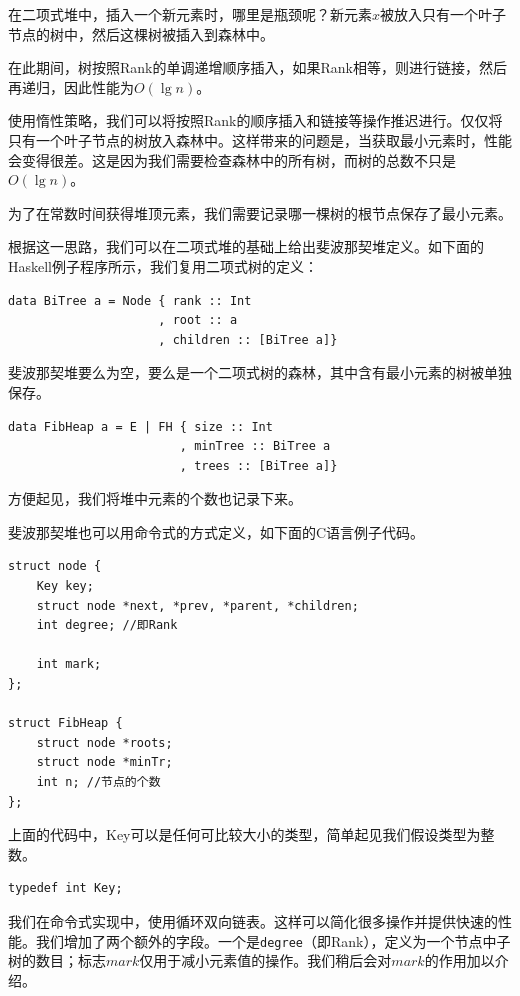 \documentclass[b5paper]{ctexart}
\begin{document}
在二项式堆中，插入一个新元素时，哪里是瓶颈呢？新元素$x$被放入只有一个叶子节点的树中，然后这棵树被插入到森林中。

在此期间，树按照Rank的单调递增顺序插入，如果Rank相等，则进行链接，然后再递归，因此性能为$O(\lg n)$。

使用惰性策略，我们可以将按照Rank的顺序插入和链接等操作推迟进行。仅仅将只有一个叶子节点的树放入森林中。这样带来的问题是，当获取最小元素时，性能会变得很差。这是因为我们需要检查森林中的所有树，而树的总数不只是$O(\lg n)$。

为了在常数时间获得堆顶元素，我们需要记录哪一棵树的根节点保存了最小元素。

根据这一思路，我们可以在二项式堆的基础上给出斐波那契堆定义。如下面的Haskell例子程序所示，我们复用二项式树的定义：

\lstset{language=Haskell}
\begin{lstlisting}[style=Haskell]
data BiTree a = Node { rank :: Int
                     , root :: a
                     , children :: [BiTree a]}
\end{lstlisting}

斐波那契堆要么为空，要么是一个二项式树的森林，其中含有最小元素的树被单独保存。

\begin{lstlisting}[style=Haskell]
data FibHeap a = E | FH { size :: Int
                        , minTree :: BiTree a
                        , trees :: [BiTree a]}
\end{lstlisting}

方便起见，我们将堆中元素的个数也记录下来。

斐波那契堆也可以用命令式的方式定义，如下面的C语言例子代码。

\lstset{language=C}
\begin{lstlisting}
struct node {
    Key key;
    struct node *next, *prev, *parent, *children;
    int degree; //即Rank

    int mark;
};

struct FibHeap {
    struct node *roots;
    struct node *minTr;
    int n; //节点的个数
};
\end{lstlisting}

上面的代码中，Key可以是任何可比较大小的类型，简单起见我们假设类型为整数。

\lstset{language=C}
\begin{lstlisting}
typedef int Key;
\end{lstlisting}

我们在命令式实现中，使用循环双向链表\cite{CLRS}。这样可以简化很多操作并提供快速的性能。我们增加了两个额外的字段。一个是\texttt{degree}（即Rank），定义为一个节点中子树的数目；标志$mark$仅用于减小元素值的操作。我们稍后会对$mark$的作用加以介绍。
\end{document}
